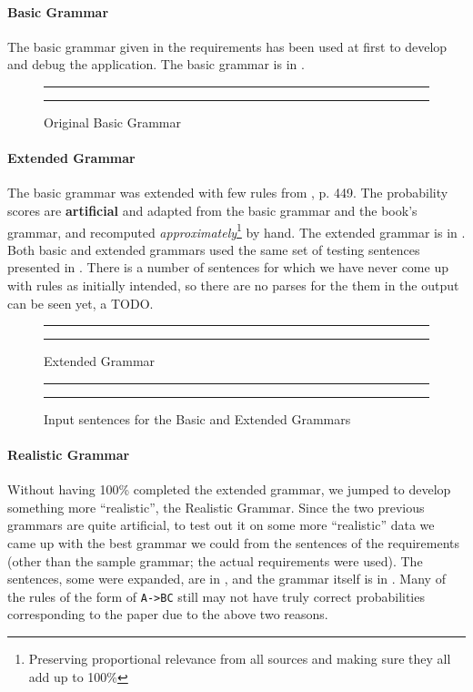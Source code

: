 \paragraph{Basic Grammar}

The basic grammar given in the requirements has been
used at first to develop and debug the application.
The basic grammar is in .

\begin{figure}
\hrule\vskip4pt
\tiny

\normalsize
\caption{Original Basic Grammar}
\label{fig:basic-grammar}
\vskip4pt\hrule
\end{figure}

\paragraph{Extended Grammar}

The basic grammar was extended with few rules
from \cite{jurafsky}, p. 449.
The probability scores are {\bf artificial} and
adapted from the basic grammar and the book's grammar, and
recomputed {\em approximately}\footnote{Preserving proportional relevance from all sources
and making sure they all add up to 100\%} by hand.
The extended grammar is in .
Both basic and extended grammars used the same set of
testing sentences presented in .
There is a number of sentences for which we have never come up
with rules as initially intended, so there are no parses
for the them in the output can be seen yet, a TODO.

\begin{figure}
\hrule\vskip4pt
\tiny

\normalsize
\caption{Extended Grammar}
\label{fig:extended-grammar}
\vskip4pt\hrule
\end{figure}

\begin{figure}
\hrule\vskip4pt

\caption{Input sentences for the Basic and Extended Grammars}
\label{fig:test-sentences}
\vskip4pt\hrule
\end{figure}

\paragraph{Realistic Grammar}\label{sect:realistic-grammar}

Without having 100\% completed the extended grammar, we jumped
to develop something more ``realistic'', the Realistic Grammar.
Since the two previous grammars are quite artificial, to test
out it on some more ``realistic'' data we came up with the
best grammar we could
from the sentences of the requirements (other than
the sample grammar; the actual requirements were used).
The sentences, some were expanded, are in ,
and the grammar itself is in . Many of the rules
of the form of \verb+A->BC+ still may not have truly correct probabilities
corresponding to the paper due to the above two reasons.

